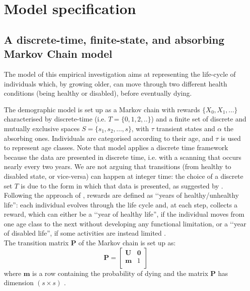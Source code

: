 



\section{Model specification}
\subsection{A discrete-time, finite-state, and absorbing\\ Markov Chain model}
The model of this empirical investigation aims at representing the life-cycle of individuals which, by growing older, can move through two different health conditions (being healthy or disabled), before eventually dying.

The demographic model is set up as a Markov chain with rewards $\{X_0, X_1, ...\}$ characterised by discrete-time (i.e. $T = \{ 0,1,2,..\}$) and a finite set of discrete and mutually exclusive spaces $S = \{s_1, s_2, ..., s\}$, with $\tau$ transient states and $\alpha$ the absorbing ones. Individuals are categorised according to their age, and $\tau$ is used to represent age classes.
Note that model applies a discrete time framework because the data are presented in discrete time, i.e. with a scanning that occurs nearly every two years. We are not arguing that transitions (from healthy to disabled state, or vice-versa) can happen at integer time: the choice of a discrete set $T$ is due to the form in which that data is presented, as suggested by \cite{haberman1999}.\\

Following the approach of \cite{Caswell2018}, rewards are defined as \lq\lq years of healthy/unhealthy life'': each individual evolves through the life cycle and, at each step, collects a reward, which can either be a \lq\lq year of healthy life'', if the individual moves from one age class to the next without developing any functional limitation, or a \lq\lq year of disabled life'', if some activities are instead limited \citep{Caswell2018}. \\

The transition matrix $\mathbf{P}$ of the Markov chain is set up as:
\begin{equation}
    \mathbf{P} = 
    \begin{bmatrix}
    \mathbf{U} & \mathbf{0}\\
    \mathbf{m} & 1\\
    \end{bmatrix}
    \end{equation}
where $\mathbf{m}$ is a row containing the probability of dying and the matrix $\mathbf{P}$ has dimension $(s \times s)$ \citep{Caswell2018}.\\


